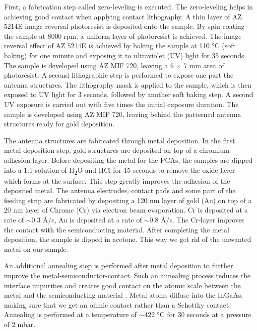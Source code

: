 First, a fabrication step called zero-leveling is executed. The zero-leveling helps in achieving good contact when applying contact lithography. A thin layer of AZ 5214E image reversal photoresist is deposited onto the sample. By spin coating the sample at 8000 rpm, a uniform layer of photoresist is achieved. The image reversal effect of AZ 5214E is achieved by baking the sample at \num{110} \si{\celsius} (soft baking) for one minute and exposing it to ultraviolet (UV) light for \num{35} seconds. The sample is developed using AZ MIF 720, leaving a \num{6} $\times$ \num{7} \si{\milli\meter} area of photoresist.
A second lithographic step is performed to expose one part the antenna structures. The lithography mask is applied to the sample, which is then exposed to UV light for \num{3} seconds, followed by another soft baking step. A second UV exposure is carried out with five times the initial exposure duration. The sample is developed using AZ MIF 720, leaving behind the patterned antenna structures ready for gold deposition. 

The antenna structures are fabricated through metal deposition. In the first metal deposition step, gold structures are deposited on top of a chromium adhesion layer. Before depositing the metal for the PCAs, the samples are dipped into a 1:1 solution of H\textsubscript{2}O and HCl for \num{15} seconds to remove the oxide layer which forms at the surface. This step greatly improves the adhesion of the deposited metal. The antenna electrodes, contact pads and some part of the feeding strip are fabricated by depositing a \num{120} \si{\nano\meter} layer of gold (Au) on top of a \num{20} \si{\nano\meter} layer of Chrome (Cr) via electron beam evaporation. Cr is deposited at a rate of $\sim 0.3$ \si{\angstrom}/\si{\s}, Au is deposited at a rate of $\sim 0.8$ \si{\angstrom}/\si{\s}. The Cr-layer improves the contact with the semiconducting material. After completing the metal deposition, the sample is dipped in acetone. This way we get rid of the unwanted metal on our sample. 

An additional annealing step is performed after metal deposition to further improve the metal-semiconductor-contact. Such an annealing process reduces the interface impurities and creates good contact on the atomic scale between the metal and the semiconducting material \cite{tahamtanInvestigationEffectAnnealing2011}. Metal atoms diffuse into the InGaAs, making sure that we get an ohmic contact rather than a Schottky contact. Annealing is performed at a temperature of $\sim 422$ \si{\celsius} for \num{30} seconds at a pressure of \num{2} \si{\milli \bar}. 

